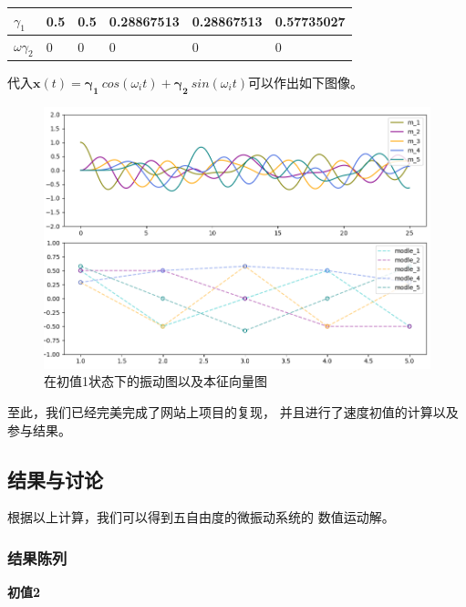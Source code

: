 \documentclass[11pt, a4paper, oneside]{ctexart}
\begin{document}
{{{{\begin{table}[h]
    \begin{tabular}{@{}p{1cm}<{\centering}p{2cm}<{\centering}p{2cm}<{\centering}p{2cm}<{\centering}p{2cm}<{\centering}p{2cm}<{\centering}@{}}
    \toprule
    $\gamma_1$       & 0.5 & 0.5 & 0.28867513 & 0.28867513 & 0.57735027 \\ \midrule
    $\omega\gamma_2$ & 0   & 0   & 0          & 0          & 0          \\ \bottomrule
    \end{tabular}
    \end{table}
    
    代入$\bm x(t)=\bm{\gamma_{1}}\ cos(\omega_it)+\bm{\gamma_{2}}\ sin(\omega_it)
    $可以作出如下图像。
    
    \begin{figure}[!ht]
        
        \centering
        \vspace{2mm}
        \includegraphics[scale=0.6]{pic5_png.png}
        \caption{在初值1状态下的振动图以及本征向量图 }
    \end{figure} 

    至此，我们已经完美完成了网站上项目的复现，
    并且进行了速度初值的计算以及参与结果。


} 
\subsection{结果与讨论}
根据以上计算，我们可以得到五自由度的微振动系统的
数值运动解。
\subsubsection{结果陈列}
\vspace{5mm}
\textbf{初值2}

}}}
\end{document}
